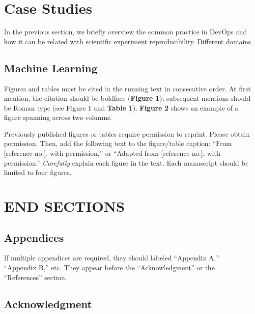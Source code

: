 \documentclass{IEEEcsmag}
\begin{document}
\section{Case Studies}
In the previous section, we briefly overview the common practice in DevOps and how it can be related with scientific experiment reproducibility. Different domains 

\subsection{Machine Learning}






Figures and tables must be cited in the running text in consecutive order. At first mention, the citation should be boldface ({\bf Figure 1}); subsequent mentions should be Roman type (see Figure 1 and {\bf Table 1}). {\bf Figure 2} shows an example of a figure spanning across two columns.
 

Previously published figures or tables require permission to reprint. Please obtain permission. Then, add the following text to the figure/table caption: ``From [reference no.], with permission,'' or ``Adapted from [reference no.], with permission.'' {\it Carefully} explain each figure in the text. Each manuscript should be limited to four figures.\pagebreak

\section{END SECTIONS}

\subsection{Appendices}

If multiple appendices are required, they should labeled ``Appendix A,'' ``Appendix B,'' etc. They appear before the ``Acknowledgment'' or the ``References'' section.

\subsection{Acknowledgment}
\end{document}
